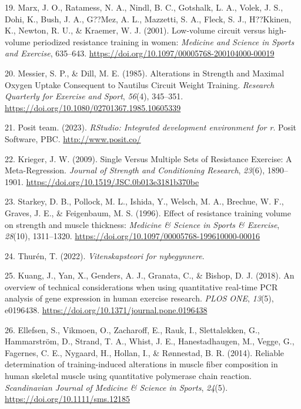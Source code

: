 \documentclass[
  letterpaper,
  DIV=11,
  numbers=noendperiod]{scrreprt}
\newlength{\cslhangindent}
\newenvironment{CSLReferences}[2] %
 {\begin{list}{}{%
  \setlength{\itemindent}{0pt}
  \setlength{\leftmargin}{0pt}
  \setlength{\parsep}{0pt}
  \ifodd #1
   \setlength{\leftmargin}{\cslhangindent}
   \setlength{\itemindent}{-1\cslhangindent}
  \fi
  \setlength{\itemsep}{#2\baselineskip}}}
 {\end{list}}
\begin{document}
\begin{CSLReferences}{1}{0}
19. Marx, J. O., Ratamess, N. A., Nindl, B. C., Gotshalk, L. A., Volek,
J. S., Dohi, K., Bush, J. A., G??Mez, A. L., Mazzetti, S. A., Fleck, S.
J., H??Kkinen, K., Newton, R. U., \& Kraemer, W. J. (2001). Low-volume
circuit versus high-volume periodized resistance training in women:
\emph{Medicine and Science in Sports and Exercise}, 635--643.
\url{https://doi.org/10.1097/00005768-200104000-00019}

20. Messier, S. P., \& Dill, M. E. (1985). Alterations in Strength and
Maximal Oxygen Uptake Consequent to Nautilus Circuit Weight Training.
\emph{Research Quarterly for Exercise and Sport}, \emph{56}(4),
345--351. \url{https://doi.org/10.1080/02701367.1985.10605339}

21. Posit team. (2023). \emph{RStudio: Integrated development
environment for r}. Posit Software, PBC. \url{http://www.posit.co/}

22. Krieger, J. W. (2009). Single Versus Multiple Sets of Resistance
Exercise: A Meta-Regression. \emph{Journal of Strength and Conditioning
Research}, \emph{23}(6), 1890--1901.
\url{https://doi.org/10.1519/JSC.0b013e3181b370be}

23. Starkey, D. B., Pollock, M. L., Ishida, Y., Welsch, M. A., Brechue,
W. F., Graves, J. E., \& Feigenbaum, M. S. (1996). Effect of resistance
training volume on strength and muscle thickness: \emph{Medicine \&
Science in Sports \& Exercise}, \emph{28}(10), 1311--1320.
\url{https://doi.org/10.1097/00005768-199610000-00016}

24. Thurén, T. (2022). \emph{Vitenskapsteori for nybegynnere}.

25. Kuang, J., Yan, X., Genders, A. J., Granata, C., \& Bishop, D. J.
(2018). An overview of technical considerations when using quantitative
real-time PCR analysis of gene expression in human exercise research.
\emph{PLOS ONE}, \emph{13}(5), e0196438.
\url{https://doi.org/10.1371/journal.pone.0196438}

26. Ellefsen, S., Vikmoen, O., Zacharoff, E., Rauk, I., Slettaløkken,
G., Hammarström, D., Strand, T. A., Whist, J. E., Hanestadhaugen, M.,
Vegge, G., Fagernes, C. E., Nygaard, H., Hollan, I., \& Rønnestad, B. R.
(2014). Reliable determination of training-induced alterations in muscle
fiber composition in human skeletal muscle using quantitative polymerase
chain reaction. \emph{Scandinavian Journal of Medicine \& Science in
Sports}, \emph{24}(5). \url{https://doi.org/10.1111/sms.12185}


\end{CSLReferences}
\end{document}
